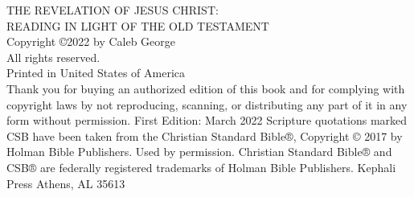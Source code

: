 \pagestyle{empty}
\frontmatter

\titleGM

\clearpage

\begin{vplace}[2]
\noindent
THE REVELATION OF JESUS CHRIST: \\READING IN LIGHT OF THE OLD TESTAMENT\\
\newline
Copyright \copyright 2022 by Caleb George\\
All rights reserved.\\
\newline
Printed in United States of America\\
\newline
Thank you for buying an authorized edition of this book and for complying with copyright laws by not reproducing, scanning, or distributing any part of it in any form without permission.
\newline
\newline
First Edition: March 2022
\newline
\newline
Scripture quotations marked CSB have been taken from the Christian Standard Bible®, Copyright © 2017 by Holman Bible Publishers. Used by permission. Christian Standard Bible® and CSB® are federally registered trademarks of Holman Bible Publishers.
\newline
\newline
Kephali Press
\newline
Athens, AL 35613
\end{vplace}

\clearpage
\clearpage

\dedication
\clearpage

